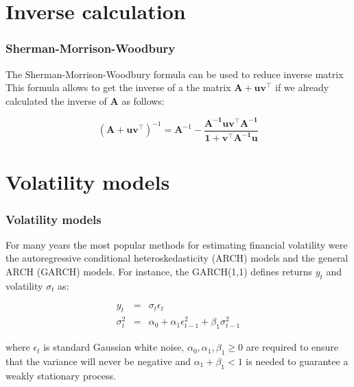 \documentclass{beamer}
\begin{document}
\section{Inverse calculation}
\begin{frame}
\frametitle{Sherman-Morrison-Woodbury}
The Sherman-Morrison-Woodbury formula can be used to reduce inverse matrix
This
formula allows to get the inverse of a
the matrix $\mathbf{A+uv^\top}$ if we already calculated the
inverse of $\mathbf{A}$ as follows:

\begin{equation}
\label{eq:SMW}
(\mathbf{A+uv^\top})^{-1}=\mathbf{A}^{-1}-
\frac{\mathbf{A^{-1}uv^\top A^{-1}}}{\mathbf{1+v^\top A^{-1}u}}
\end{equation}
\end{frame}

\section{Volatility models}

\begin{frame}
\frametitle{Volatility models}
For many years the most popular methods for estimating financial volatility were
the autoregressive conditional heteroskedasticity (ARCH) models
and the general ARCH (GARCH) models. For instance, the
GARCH(1,1) defines returns $y_t$ and volatility $\sigma_t$ as:

\begin{eqnarray*}
    y_t &=& \sigma_t \epsilon_t \\
     \sigma_t^2 &=& \alpha_0 + \alpha_1 \epsilon_{t-1}^2 + \beta_1
     \sigma_{t-1}^2
\end{eqnarray*}

\noindent where $\epsilon_t$ is standard Gaussian white noise,
$\alpha_0,\alpha_1,\beta_1 \geq 0$ are required to ensure that the
variance will never be negative and $\alpha_1+\beta_1 <1$ is needed to
guarantee a weakly stationary process.
\end{frame}
\end{document}
